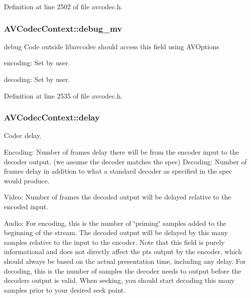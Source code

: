 Definition at line 2502 of file avcodec.\+h.

\subsubsection[{\texorpdfstring{debug\+\_\+mv}{debug_mv}}]{ A\+V\+Codec\+Context\+::debug\+\_\+mv}\hypertarget{struct_a_v_codec_context_ad823755aadd6eec734c216dbb17f145d}{}\label{struct_a_v_codec_context_ad823755aadd6eec734c216dbb17f145d}
debug Code outside libavcodec should access this field using A\+V\+Options
\begin{DoxyItemize}
\item encoding\+: Set by user.
\item decoding\+: Set by user. 
\end{DoxyItemize}

Definition at line 2535 of file avcodec.\+h.

\subsubsection[{\texorpdfstring{delay}{delay}}]{ A\+V\+Codec\+Context\+::delay}\hypertarget{struct_a_v_codec_context_a948993adfdfcd64b81dad1151fe50f33}{}\label{struct_a_v_codec_context_a948993adfdfcd64b81dad1151fe50f33}
Codec delay.

Encoding\+: Number of frames delay there will be from the encoder input to the decoder output. (we assume the decoder matches the spec) Decoding\+: Number of frames delay in addition to what a standard decoder as specified in the spec would produce.

Video\+: Number of frames the decoded output will be delayed relative to the encoded input.

Audio\+: For encoding, this is the number of \char`\"{}priming\char`\"{} samples added to the beginning of the stream. The decoded output will be delayed by this many samples relative to the input to the encoder. Note that this field is purely informational and does not directly affect the pts output by the encoder, which should always be based on the actual presentation time, including any delay. For decoding, this is the number of samples the decoder needs to output before the decoder\textquotesingle{}s output is valid. When seeking, you should start decoding this many samples prior to your desired seek point.


